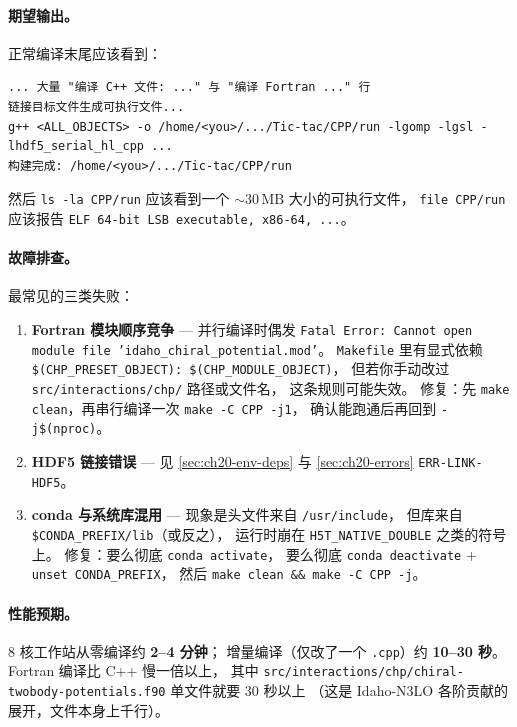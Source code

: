 \paragraph{期望输出。}
正常编译末尾应该看到：
\begin{lstlisting}[style=config]
... 大量 "编译 C++ 文件: ..." 与 "编译 Fortran ..." 行
链接目标文件生成可执行文件...
g++ <ALL_OBJECTS> -o /home/<you>/.../Tic-tac/CPP/run -lgomp -lgsl -lhdf5_serial_hl_cpp ...
构建完成: /home/<you>/.../Tic-tac/CPP/run
\end{lstlisting}
然后 \texttt{ls -la CPP/run} 应该看到一个 $\sim 30\,\mathrm{MB}$ 大小的可执行文件，
\texttt{file CPP/run} 应该报告 \texttt{ELF 64-bit LSB executable, x86-64, ...}。

\paragraph{故障排查。}
最常见的三类失败：
\begin{enumerate}
  \item \textbf{Fortran 模块顺序竞争} —
        并行编译时偶发 \texttt{Fatal Error: Cannot open module file 'idaho\_chiral\_potential.mod'}。
        \texttt{Makefile} 里有显式依赖
        \texttt{\$(CHP\_PRESET\_OBJECT): \$(CHP\_MODULE\_OBJECT)}，
        但若你手动改过 \texttt{src/interactions/chp/} 路径或文件名，
        这条规则可能失效。
        修复：先 \texttt{make clean}，再串行编译一次 \texttt{make -C CPP -j1}，
        确认能跑通后再回到 \texttt{-j\$(nproc)}。
  \item \textbf{HDF5 链接错误} — 见 \cref{sec:ch20-env-deps} 与 \cref{sec:ch20-errors} \texttt{ERR-LINK-HDF5}。
  \item \textbf{conda 与系统库混用} — 现象是头文件来自 \texttt{/usr/include}，
        但库来自 \texttt{\$CONDA\_PREFIX/lib}（或反之），
        运行时崩在 \texttt{H5T\_NATIVE\_DOUBLE} 之类的符号上。
        修复：要么彻底 \texttt{conda activate}，
        要么彻底 \texttt{conda deactivate} + \texttt{unset CONDA\_PREFIX}，
        然后 \texttt{make clean \&\& make -C CPP -j}。
\end{enumerate}

\paragraph{性能预期。}
8 核工作站从零编译约 \textbf{2--4 分钟}；
增量编译（仅改了一个 \texttt{.cpp}）约 \textbf{10--30 秒}。
Fortran 编译比 C++ 慢一倍以上，
其中 \texttt{src/interactions/chp/chiral-twobody-potentials.f90} 单文件就要 30 秒以上
（这是 Idaho-N3LO 各阶贡献的展开，文件本身上千行）。

